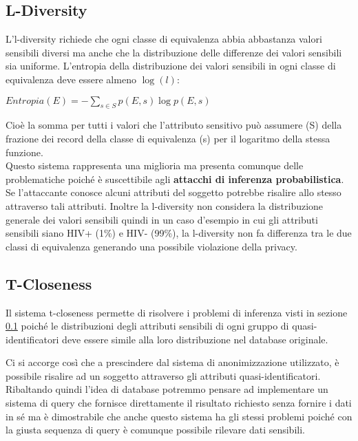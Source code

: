 \subsection{L-Diversity}
\label{subsec:tdiversity}
L'l-diversity richiede che ogni classe di equivalenza abbia abbastanza valori sensibili diversi ma anche che la distribuzione delle differenze dei valori sensibili sia uniforme.
L'entropia della distribuzione dei valori sensibili in ogni classe di equivalenza deve essere almeno $\log (l)$:
\begin{center}
$Entropia(E)=-\sum\limits_{s \in S}p(E, s)\log p(E, s)$\\
\end{center}
Cioè la somma per tutti i valori che l'attributo sensitivo può assumere (S) della frazione dei record della classe di equivalenza (s) per il logaritmo della stessa funzione.\\
Questo sistema rappresenta una miglioria ma presenta comunque delle problematiche poiché è suscettibile agli \textbf{attacchi di inferenza probabilistica}.
Se l'attaccante conosce alcuni attributi del soggetto potrebbe risalire allo stesso attraverso tali attributi.
Inoltre la l-diversity non considera la distribuzione generale dei valori sensibili quindi in un caso d'esempio in cui gli attributi sensibili siano HIV+ (1\%) e HIV- (99\%), la l-diversity non fa differenza tra le due classi di equivalenza generando una possibile violazione della privacy.

\subsection{T-Closeness}
Il sistema t-closeness permette di risolvere i problemi di inferenza visti in sezione \ref{subsec:tdiversity} poiché le distribuzioni degli attributi sensibili di ogni gruppo di quasi-identificatori deve essere simile alla loro distribuzione nel database originale.

Ci si accorge così che a prescindere dal sistema di anonimizzazione utilizzato, è possibile risalire ad un soggetto attraverso gli attributi quasi-identificatori.\\
Ribaltando quindi l'idea di database potremmo pensare ad implementare un sistema di query che fornisce direttamente il risultato richiesto senza fornire i dati in sé ma è dimostrabile che anche questo sistema ha gli stessi problemi poiché con la giusta sequenza di query è comunque possibile rilevare dati sensibili.

